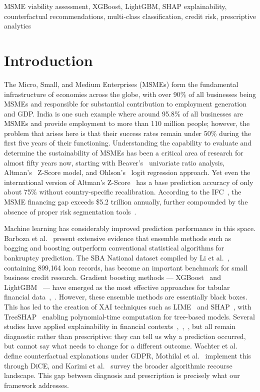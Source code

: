 \documentclass[conference]{IEEEtran}
\begin{document}
\begin{IEEEkeywords}
MSME viability assessment, XGBoost, LightGBM, SHAP explainability, counterfactual recommendations, multi-class classification, credit risk, prescriptive analytics
\end{IEEEkeywords}

\section{Introduction}

The Micro, Small, and Medium Enterprises (MSMEs) form the fundamental infrastructure of economies across the globe, with over 90\% of all businesses being MSMEs and responsible for substantial contribution to employment generation and GDP. India is one such example where around 95.8\% of all businesses are MSMEs and provide employment to more than 110 million people; however, the problem that arises here is that their success rates remain under 50\% during the first five years of their functioning. Understanding the capability to evaluate and determine the sustainability of MSMEs has been a critical area of research for almost fifty years now, starting with Beaver's~\cite{1} univariate ratio analysis, Altman's~\cite{2} Z-Score model, and Ohlson's~\cite{3} logit regression approach. Yet even the international version of Altman's Z-Score~\cite{4} has a base prediction accuracy of only about 75\% without country-specific recalibration. According to the IFC~\cite{6}, the MSME financing gap exceeds \$5.2 trillion annually, further compounded by the absence of proper risk segmentation tools~\cite{7}.

Machine learning has considerably improved prediction performance in this space. Barboza et al.~\cite{5} present extensive evidence that ensemble methods such as bagging and boosting outperform conventional statistical algorithms for bankruptcy prediction. The SBA National dataset compiled by Li et al.~\cite{8}, containing 899,164 loan records, has become an important benchmark for small business credit research. Gradient boosting methods --- XGBoost~\cite{10} and LightGBM~\cite{11} --- have emerged as the most effective approaches for tabular financial data~\cite{13},~\cite{14}. However, these ensemble methods are essentially black boxes. This has led to the creation of XAI techniques such as LIME~\cite{16} and SHAP~\cite{17}, with TreeSHAP~\cite{18} enabling polynomial-time computation for tree-based models. Several studies have applied explainability in financial contexts~\cite{22},~\cite{23},~\cite{24}, but all remain diagnostic rather than prescriptive: they can tell us why a prediction occurred, but cannot say what needs to change for a different outcome. Wachter et al.~\cite{19} define counterfactual explanations under GDPR, Mothilal et al.~\cite{20} implement this through DiCE, and Karimi et al.~\cite{21} survey the broader algorithmic recourse landscape. This gap between diagnosis and prescription is precisely what our framework addresses.
\end{document}

